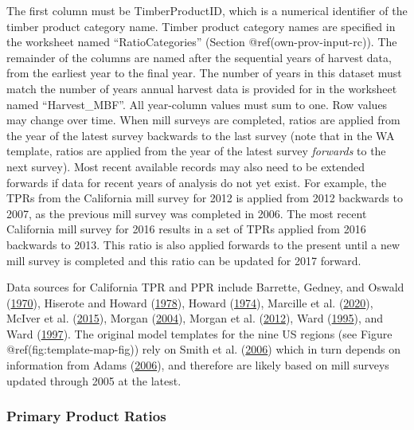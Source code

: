 \documentclass[
  openany]{book}
\begin{document}
The first column must be TimberProductID, which is a numerical
identifier of the timber product category name. Timber product category
names are specified in the worksheet named ``RatioCategories'' (Section
@ref(own-prov-input-rc)). The remainder of the columns are named after
the sequential years of harvest data, from the earliest year to the
final year. The number of years in this dataset must match the number of
years annual harvest data is provided for in the worksheet named
``Harvest\_MBF''. All year-column values must sum to one. Row values may
change over time. When mill surveys are completed, ratios are applied
from the year of the latest survey backwards to the last survey (note
that in the WA template, ratios are applied from the year of the latest
survey \emph{forwards} to the next survey). Most recent available
records may also need to be extended forwards if data for recent years
of analysis do not yet exist. For example, the TPRs from the California
mill survey for 2012 is applied from 2012 backwards to 2007, as the
previous mill survey was completed in 2006. The most recent California
mill survey for 2016 results in a set of TPRs applied from 2016
backwards to 2013. This ratio is also applied forwards to the present
until a new mill survey is completed and this ratio can be updated for
2017 forward.

Data sources for California TPR and PPR include Barrette, Gedney, and
Oswald (\protect\hyperlink{ref-barrette1970}{1970}), Hiserote and Howard
(\protect\hyperlink{ref-hiserote1978}{1978}), Howard
(\protect\hyperlink{ref-howard1974}{1974}), Marcille et al.
(\protect\hyperlink{ref-marcille2020}{2020}), McIver et al.
(\protect\hyperlink{ref-mciver2015}{2015}), Morgan
(\protect\hyperlink{ref-morgan2004}{2004}), Morgan et al.
(\protect\hyperlink{ref-morgan2012}{2012}), Ward
(\protect\hyperlink{ref-ward1995}{1995}), and Ward
(\protect\hyperlink{ref-ward1997}{1997}). The original model templates
for the nine US regions (see Figure @ref(fig:template-map-fig)) rely on
Smith et al. (\protect\hyperlink{ref-smith2006}{2006}) which in turn
depends on information from Adams
(\protect\hyperlink{ref-adams2006}{2006}), and therefore are likely
based on mill surveys updated through 2005 at the latest.

\hypertarget{own-prov-input-ppr}{%
\subsubsection{Primary Product Ratios}\label{own-prov-input-ppr}}
\end{document}
